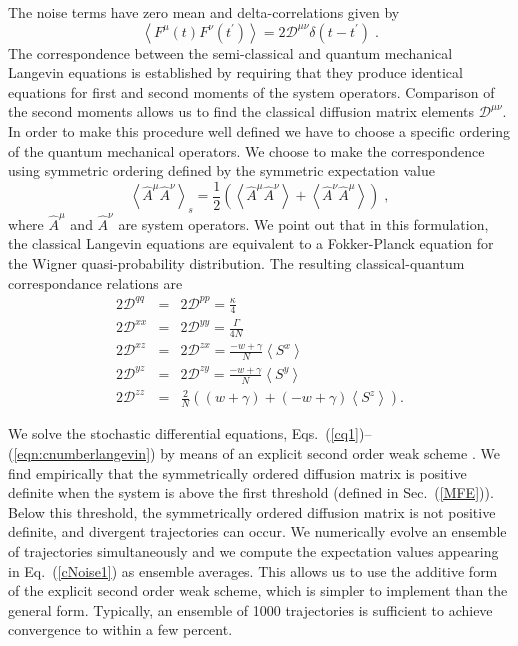 \documentclass[aps,
twocolumn,
showpacs,
superscriptaddress,groupedaddress]{revtex4}
\begin{document}
The noise terms have zero mean and delta-correlations given by
\begin{equation}
\left< F^{\mu}(t) F^{\nu}(t^{\prime})\right> =
2 \mathscr{D}^{\mu \nu} \delta(t-t^{\prime})\;.
\label{ClassicalDiffusion1}
\end{equation}
The correspondence between the semi-classical and quantum mechanical
Langevin equations is established by requiring that they produce
identical equations for first and second moments of the system
operators.  Comparison of the second moments allows us to find the
classical diffusion matrix elements $\mathscr{D}^{\mu \nu}$.  In order
to make this procedure well defined we have to choose a specific
ordering of the quantum mechanical operators.  We choose to make the
correspondence using symmetric ordering defined by the symmetric
expectation value
\begin{equation}
\left< \hat{A}^{\mu} \hat{A}^{\nu} \right>_s=
\frac{1}{2} \left( \left< \hat{A}^{\mu} \hat{A}^{\nu} \right> + \left<
\hat{A}^{\nu} \hat{A}^{\mu} \right> \right)\;,
\end{equation}
where $\hat{A}^{\mu}$ and $\hat{A}^{\nu}$ are system operators.  We
point out that in this formulation, the classical Langevin equations
are equivalent to a Fokker-Planck equation for the Wigner
quasi-probability distribution. The resulting classical-quantum
correspondance relations are
\begin{eqnarray}
  2\mathscr{D}^{q q}&=&
                        2\mathscr{D}^{p p}=
                        \frac{\kappa}{4} \nonumber \\
  2\mathscr{D}^{xx}&=&
                       2\mathscr{D}^{yy}=
                       \frac{\Gamma}{4N} \nonumber \\
  2\mathscr{D}^{xz}&=&
                       2\mathscr{D}^{zx}=
                       \frac{-w+\gamma}{N} \left< S^{x} \right>  
                       \nonumber \\
  2\mathscr{D}^{yz}&=&
                       2\mathscr{D}^{zy}=
                       \frac{-w+\gamma}{N} \left< S^{y} \right>  
                       \nonumber \\
  2\mathscr{D}^{zz}&=&
                       \frac{2}{N}\left((w+\gamma) 
                       + (-w+\gamma)  \left< S^{z} \right> \right).
\label{cNoise1}
\end{eqnarray}

We solve the stochastic differential equations,
Eqs.~(\ref{cq1})--(\ref{eqn:cnumberlangevin}) by means of an explicit
second order weak scheme \cite{kloeden2011numerical}. We find
empirically that the symmetrically ordered diffusion matrix is positive
definite when the system is above the first threshold (defined in
Sec.~(\ref{MFE})). Below this threshold, the symmetrically ordered
diffusion matrix is not positive definite, and divergent trajectories
can occur. We numerically evolve an ensemble of trajectories
simultaneously and we compute the expectation values appearing in
Eq.~(\ref{cNoise1}) as ensemble averages. This allows us to use the
additive form of the explicit second order weak scheme, which is simpler
to implement than the general form. Typically, an ensemble of 1000
trajectories is sufficient to achieve convergence to within a few
percent.
\end{document}
